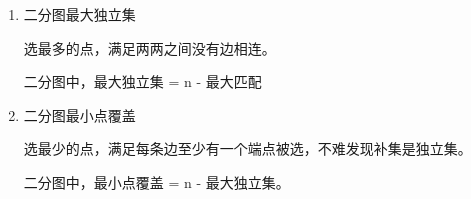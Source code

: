 \begin{enumerate}

\item 二分图最大独立集

选最多的点，满足两两之间没有边相连。

二分图中，最大独立集 = n - 最大匹配

\item 二分图最小点覆盖

选最少的点，满足每条边至少有一个端点被选，不难发现补集是独立集。

二分图中，最小点覆盖 = n - 最大独立集。

\end{enumerate}